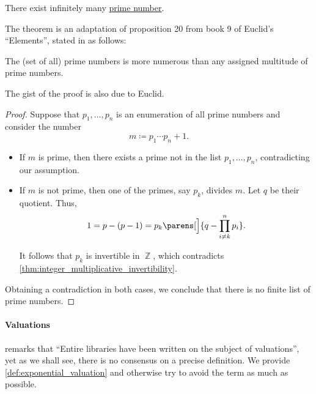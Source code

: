 \begin{theorem}\label{thm:euclids_prime_infinitude_theorem}
  There exist infinitely many \hyperref[def:prime_number]{prime number}.
\end{theorem}
\begin{comments}
  \item The theorem is an adaptation of proposition 20 from book 9 of Euclid's \enquote{Elements}, stated in \cite[271]{Euclid2008Elements} as follows:
  \begin{displayquote}
    The (set of all) prime numbers is more numerous than any assigned multitude of prime numbers.
  \end{displayquote}

  The gist of the proof is also due to Euclid.
\end{comments}
\begin{proof}
  Suppose that \( p_1, \ldots, p_n \) is an enumeration of all prime numbers and consider the number
  \begin{equation*}
    m \coloneqq p_1 \cdots p_n + 1.
  \end{equation*}

  \begin{itemize}
    \item If \( m \) is prime, then there exists a prime not in the list \( p_1, \ldots, p_n \), contradicting our assumption.

    \item If \( m \) is not prime, then one of the primes, say \( p_k \), divides \( m \). Let \( q \) be their quotient. Thus,
    \begin{equation*}
      1 = p - (p - 1) = p_k \parens[\Big]{ q - \prod_{i \neq k}^n p_i }.
    \end{equation*}

    It follows that \( p_k \) is invertible in \( \BbbZ \), which contradicts \cref{thm:integer_multiplicative_invertibility}.
  \end{itemize}

  Obtaining a contradiction in both cases, we conclude that there is no finite list of prime numbers.
\end{proof}

\paragraph{Valuations}

\Textcite[255]{Aluffi2009Algebra} remarks that \enquote{Entire libraries have been written on the subject of valuations}, yet as we shall see, there is no consensus on a precise definition. We provide \cref{def:exponential_valuation} and otherwise try to avoid the term as much as possible.

